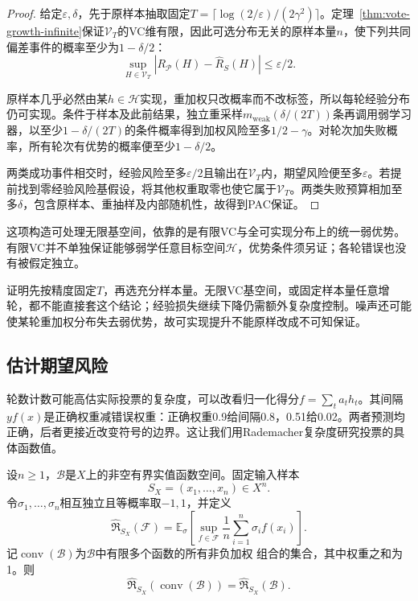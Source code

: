 \begin{proof}
给定$\varepsilon,\delta$，先于原样本抽取固定$T=\lceil\log(2/\varepsilon)/(2\gamma^2)\rceil$。定理~\ref{thm:vote-growth-infinite}保证$\mathcal V_T$的VC维有限，因此可选分布无关的原样本量$n$，使下列共同偏差事件的概率至少为$1-\delta/2$：
\[
 \sup_{H\in\mathcal V_T}|R_{\mathcal P}(H)-\hat R_S(H)|\leq\varepsilon/2.
\]


原样本几乎必然由某$h\in\mathcal H$实现，重加权只改概率而不改标签，所以每轮经验分布仍可实现。条件于样本及此前结果，独立重采样$m_{\mathrm{weak}}(\delta/(2T))$条再调用弱学习器，以至少$1-\delta/(2T)$的条件概率得到加权风险至多$1/2-\gamma$。对轮次加失败概率，所有轮次有优势的概率便至少$1-\delta/2$。

两类成功事件相交时，经验风险至多$\varepsilon/2$且输出在$\mathcal V_T$内，期望风险便至多$\varepsilon$。若提前找到零经验风险基假设，将其他权重取零也使它属于$\mathcal V_T$。两类失败预算相加至多$\delta$，包含原样本、重抽样及内部随机性，故得到PAC保证。
\end{proof}

这项构造可处理无限基空间，依靠的是有限VC与全可实现分布上的统一弱优势。有限VC并不单独保证能够弱学任意目标空间$\mathcal H$，优势条件须另证；各轮错误也没有被假定独立。

证明先按精度固定$T$，再选充分样本量。无限VC基空间，或固定样本量任意增轮，都不能直接套这个结论；经验损失继续下降仍需额外复杂度控制。噪声还可能使某轮重加权分布失去弱优势，故可实现提升不能原样改成不可知保证。

\subsection{估计期望风险}

轮数计数可能高估实际投票的复杂度，可以改看归一化得分$f=\sum_ta_th_t$。其间隔$yf(x)$是正确权重减错误权重：正确权重0.9给间隔0.8，0.51给0.02。两者预测均正确，后者更接近改变符号的边界。这让我们用Rademacher复杂度研究投票的具体函数值。

\begin{theorem}[凸组合的Rademacher复杂度]
\label{thm:learning-ensemble-convex-hull}
设$n\geq1$，$\mathcal B$是$X$上的非空有界实值函数空间。固定输入样本
\[
 S_X=(x_1,\ldots,x_n)\in X^n.
\]
令$\sigma_1,\ldots,\sigma_n$相互独立且等概率取$-1,1$，并定义
\[
 \widehat{\mathfrak R}_{S_X}(\mathcal F)
 =\mathbb E_\sigma\left[\sup_{f\in\mathcal F}
   \frac1n\sum_{i=1}^n\sigma_i f(x_i)\right].
\]
记$\operatorname{conv}(\mathcal B)$为$\mathcal B$中有限多个函数的所有非负加权
组合的集合，其中权重之和为1。则
\[
 \widehat{\mathfrak R}_{S_X}(\operatorname{conv}(\mathcal B))
 =\widehat{\mathfrak R}_{S_X}(\mathcal B).
\]
\end{theorem}

